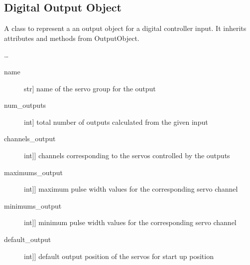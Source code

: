 \documentclass[letterpaper,10pt,english]{sphinxmanual}
\begin{document}
\subsection{Digital Output Object}
\label{\detokenize{generic:module-DigitalOutputObject}}\label{\detokenize{generic:digital-output-object}}

\begin{fulllineitems}
\label{\detokenize{generic:DigitalOutputObject.DigitalOutputObject}}
\sphinxAtStartPar
A class to represent a an output object for a digital controller input.
It inherits attributes and methods from OutputObject.

\sphinxAtStartPar
…

\sphinxAtStartPar
{}
\begin{description}
\item[{name}] \leavevmode{[}str{]}
\sphinxAtStartPar
name of the servo group for the output

\item[{num\_outputs}] \leavevmode{[}int{]}
\sphinxAtStartPar
total number of outputs calculated from the given input

\item[{channels\_output}] \leavevmode{[}{[}int{]}{]}
\sphinxAtStartPar
channels corresponding to the servos controlled by the outputs

\item[{maximums\_output}] \leavevmode{[}{[}int{]}{]}
\sphinxAtStartPar
maximum pulse width values for the corresponding servo channel

\item[{minimums\_output}] \leavevmode{[}{[}int{]}{]}
\sphinxAtStartPar
minimum pulse width values for the corresponding servo channel

\item[{default\_output}] \leavevmode{[}{[}int{]}{]}
\sphinxAtStartPar
default output position of the servos for start up position


\end{description}
\end{fulllineitems}
\end{document}
